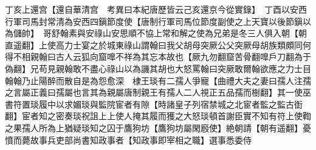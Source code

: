 丁亥上還宫【還自華清宫　考異曰本紀唐歷皆云己亥還京今從實錄】　丁酉以安西行軍司馬封常清為安西四鎭節度使【唐制行軍司馬位節度副使之上天寶以後節鎭以為儲帥】　哥舒翰素與安祿山安思順不協上常和解之使為兄弟是冬三人俱入朝【朝直遥翻】上使高力士宴之於城東祿山謂翰曰我父胡母突厥公父突厥母胡族類頗同何得不相親翰曰古人云狐向窟嘷不祥為其忘本故也【厥九勿翻窟苦骨翻嘷戶刀翻為于偽翻】兄苟見親翰敢不盡心祿山以為譏其胡也大怒罵翰曰突厥敢爾翰欲應之力士目翰翰乃止陽醉而散自是為怨愈深　棣王琰有二孺人爭寵【曲禮大夫之妻曰孺人注孺之言屬正義曰孺屬也言其為親屬唐制親王有孺人二人視正五品孺而樹翻】其一使巫書符置琰履中以求媚琰與監院宦者有隙【時諸皇子列宿禁城之北宦者監之監古衘翻】宦者知之密奏琰祝詛上上使人掩其履而獲之大怒琰頓首謝臣實不知有符上使鞫之果孺人所為上猶疑琰知之囚于鷹狗坊【鷹狗坊屬閑廏使】絶朝請【朝有遥翻】憂憤而薨故事兵吏部尚書知政事者【知政事即宰相之職】選事悉委侍

